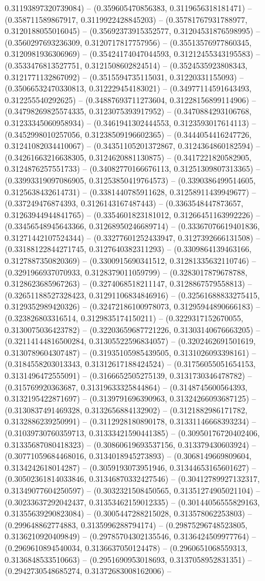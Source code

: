 0.31193897320739084) -- (0.359605470856383, 0.3119656318181471) -- (0.358711589867917, 0.3119922428845203) -- (0.35781767931788977, 0.3120188055016045) -- (0.35692373915352577, 0.31204531876598995) -- (0.3560297693236309, 0.3120717817757956) -- (0.35513576977860345, 0.3120981936306969) -- (0.35424174047044593, 0.31212455343195583) -- (0.3533476813527751, 0.3121508602824514) -- (0.3524535923808343, 0.3121771132867092) -- (0.3515594735115031, 0.31220331155093) -- (0.35066532470330813, 0.312229454183021) -- (0.34977114591643493, 0.312255540292625) -- (0.34887693711273604, 0.31228156899114906) -- (0.34798269825574335, 0.3123075393917952) -- (0.3470884293106768, 0.31233345060958934) -- (0.3461941302444553, 0.3123593017614113) -- (0.3452998010257056, 0.31238509196602365) -- (0.3444054416247726, 0.31241082034410067) -- (0.34351105201372867, 0.3124364860182594) -- (0.34261663216638305, 0.3124620881130875) -- (0.3417221820582905, 0.3124876257551733) -- (0.34082770166676113, 0.31251309807313365) -- (0.33993319097086905, 0.31253850419764573) -- (0.3390386499514605, 0.3125638432614731) -- (0.3381440785911628, 0.31258911439949677) -- (0.337249476874393, 0.3126143167487443) -- (0.3363548447873657, 0.31263944944841765) -- (0.3354601823181012, 0.31266451163992226) -- (0.33456548945643366, 0.31268950246689714) -- (0.33367076619401836, 0.31271442107524344) -- (0.33277601252433947, 0.3127392666131508) -- (0.33188122844271745, 0.3127640382311293) -- (0.3309864139463166, 0.3127887350820369) -- (0.3300915690341512, 0.31281335632110746) -- (0.3291966937070933, 0.3128379011059799) -- (0.3283017879678788, 0.3128623685967263) -- (0.3274068518211147, 0.3128867579558813) -- (0.32651188527328423, 0.31291106834846916) -- (0.32561688833275415, 0.3129352989420326) -- (0.32472186100978073, 0.31295944890666183) -- (0.323826803316514, 0.3129835174150211) -- (0.3229317152670055, 0.3130075036423782) -- (0.32203659687721226, 0.31303140676663205) -- (0.32114144816500284, 0.31305522596834057) -- (0.3202462691501619, 0.3130789604307487) -- (0.31935105985439505, 0.3131026093398161) -- (0.3184558203013343, 0.31312617188424524) -- (0.31756055051654153, 0.3131496472555091) -- (0.3166652505275139, 0.3131730346478782) -- (0.315769920363687, 0.31319633325844864) -- (0.3148745600564393, 0.3132195422871697) -- (0.3139791696390963, 0.31324266093687125) -- (0.3130837491469328, 0.3132656884132902) -- (0.3121882986171782, 0.3132886239250991) -- (0.3112928180890178, 0.31331146668393234) -- (0.31039730760359713, 0.31333421590441385) -- (0.30950176720402406, 0.31335687080418323) -- (0.30860619693537156, 0.313379430603924) -- (0.30771059684468016, 0.3134018945273893) -- (0.3068149669809604, 0.3134242618014287) -- (0.3059193073951946, 0.31344653165601627) -- (0.30502361814033846, 0.31346870332427546) -- (0.30412789927132317, 0.31349077604250597) -- (0.3032321508450565, 0.31351274905021104) -- (0.30233637292042437, 0.31353462159012335) -- (0.30144056555829163, 0.31355639290823084) -- (0.3005447288215028, 0.313578062253803) -- (0.299648862774883, 0.3135996288794174) -- (0.29875296748523805, 0.3136210920409849) -- (0.29785704302135546, 0.3136424509977764) -- (0.2969610894540034, 0.3136637050124478) -- (0.2960651068559313, 0.3136848533510663) -- (0.2951690953018693, 0.3137058952831351) -- (0.2942730548685274, 0.31372683008162006) -- 
